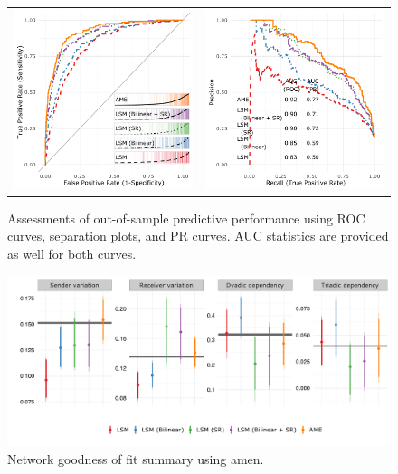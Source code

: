 \documentclass[12pt,onesided,pdflatex]{amsart}
\newcommand{\pkg}[1]{{\fontseries{b}\selectfont #1}}
\begin{document}
\begin{figure}[ht]
	\centering
	\begin{tabular}{cc}
	\includegraphics[width=.5\textwidth]{roc_latSpace_outSample} & 
	\includegraphics[width=.5\textwidth]{rocPr_latSpace_outSample}
	\end{tabular}
	\caption{Assessments of out-of-sample predictive performance using ROC curves, separation plots, and PR curves. AUC statistics are provided as well for both curves.}
	\label{fig:roc_latentSpace}
\end{figure}

\begin{figure}[ht]
	\centering
	\includegraphics[width=1\textwidth]{netPerfCoef_latSpace}
	\caption{Network goodness of fit summary using \pkg{amen}.}
	\label{fig:netPerfCoef_latSpace}
\end{figure}
\end{document}
